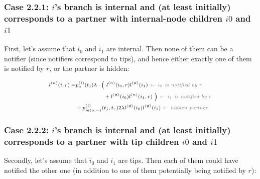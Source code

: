 \documentclass[a4paper,10pt]{article}
\begin{document}
\subsubsection*{Case 2.2.1: $i$'s branch is internal and (at least initially) corresponds to a partner with internal-node children $i0$ and $i1$} 

First, let's assume that $i_0$ and $i_1$ are internal. Then none of them can be a notifier (since notifiers correspond to tips), and hence either exactly one of them is notified by $r$, or the partner is hidden:

\begin{equation}
\scriptsize
\begin{split}
l^{(n)}(i, r) = &p_o^{(i)}(t_j) \lambda \cdot
\Big(~l^{(n)}(i_0,r)l^{(\not{n})}(i_1) \textit{\color{gray}~$\leftarrow$ $i_0$ is notified by $r$} \\
& ~~~~~~~~~~~~~~~+ l^{(\not{n})}(i_0)l^{(n)}(i_1,r)~\Big) \textit{\color{gray}~$\leftarrow$ $i_1$ is notified by $r$} \\
& + p_{m(o,-)}^{(i)}(t_j,t_r) 2 \lambda l^{(\not{n})}(i_0)l^{(\not{n})}(i_1) \textit{\color{gray}~$\leftarrow$ hidden partner}\\
 \end{split}
\label{eq:lp-int-int}
\end{equation}

\subsubsection*{Case 2.2.2: $i$'s branch is internal and (at least initially) corresponds to a partner with tip children $i0$ and $i1$} 
Secondly, let's assume that $i_0$ and $i_1$ are tips. Then each of them could have notified the other one (in addition to one of them potentially being notified by $r$):
\end{document}

